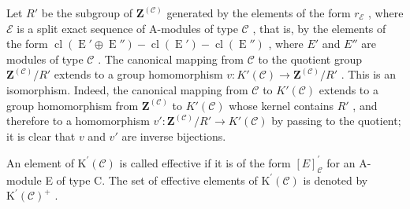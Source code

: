 Let \(R'\) be the subgroup of \(\mathbf{Z}^{(\mathcal{C})}\) generated by the elements of the form \(r_{\mathcal{E}}\) , where \(\mathcal{E}\) is a split exact sequence of A-modules of type \(\mathcal{C}\) , that is, by the elements of the form \(\operatorname{cl}(\operatorname{E}' \oplus \operatorname{E}'') - \operatorname{cl}(\operatorname{E}') - \operatorname{cl}(\operatorname{E}'')\) , where \(E'\) and \(E''\) are modules of type \(\mathcal{C}\) . The canonical mapping from \(\mathcal{C}\) to the quotient group \(\mathbf{Z}^{(\mathcal{C})}/R'\) extends to a group homomorphism \(v: K'(\mathcal{C}) \to \mathbf{Z}^{(\mathcal{C})}/R'\) . This is an isomorphism. Indeed, the canonical mapping from \(\mathcal{C}\) to \(K'(\mathcal{C})\) extends to a group homomorphism from \(\mathbf{Z}^{(\mathcal{C})}\) to \(K'(\mathcal{C})\) whose kernel contains \(R'\) , and therefore to a homomorphism \(v': \mathbf{Z}^{(\mathcal{C})}/R' \to K'(\mathcal{C})\) by passing to the quotient; it is clear that \(v\) and \(v'\) are inverse bijections.

An element of \(\mathrm{K}^{\prime}(\mathcal{C})\) is called effective if it is of the form \([E]_{\mathcal{C}}^{\prime}\) for an A-module E of type C. The set of effective elements of \(\mathrm{K}^{\prime}(\mathcal{C})\) is denoted by \(\mathrm{K}^{\prime}(\mathcal{C})^{+}\) .

